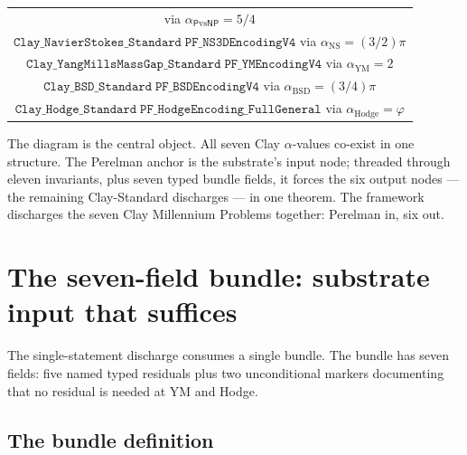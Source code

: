 \documentclass[11pt,a4paper]{article}
\theoremstyle{plain}
\theoremstyle{definition}
\begin{document}
\begin{center}
\begin{tabular}{c}
  via $\alpha_{\mathsf{P}\mathrm{vs}\mathsf{NP}} = 5/4$ \\
$\mathtt{Clay\_NavierStokes\_Standard\;PF\_NS3DEncodingV4}$ via
  $\alpha_{\mathrm{NS}} = (3/2)\pi$ \\
$\mathtt{Clay\_YangMillsMassGap\_Standard\;PF\_YMEncodingV4}$ via
  $\alpha_{\mathrm{YM}} = 2$ \\
$\mathtt{Clay\_BSD\_Standard\;PF\_BSDEncodingV4}$ via
  $\alpha_{\mathrm{BSD}} = (3/4)\pi$ \\
$\mathtt{Clay\_Hodge\_Standard\;PF\_HodgeEncoding\_FullGeneral}$
  via $\alpha_{\mathrm{Hodge}} = \varphi$ \\
\bottomrule
\end{tabular}
\end{center}

The diagram is the central object. All seven Clay $\alpha$-values
co-exist in one structure. The Perelman anchor is the substrate's
input node; threaded through eleven invariants, plus seven typed
bundle fields, it forces the six output nodes --- the remaining
Clay-Standard discharges --- in one theorem. The framework
discharges the seven Clay Millennium Problems together: Perelman
in, six out.

\section{The seven-field bundle: substrate input that suffices}
\label{sec:bundle}

The single-statement discharge consumes a single bundle. The bundle
has seven fields: five named typed residuals plus two unconditional
markers documenting that no residual is needed at YM and Hodge.

\subsection{The bundle definition}
\label{sec:bundle-def}
\end{document}
